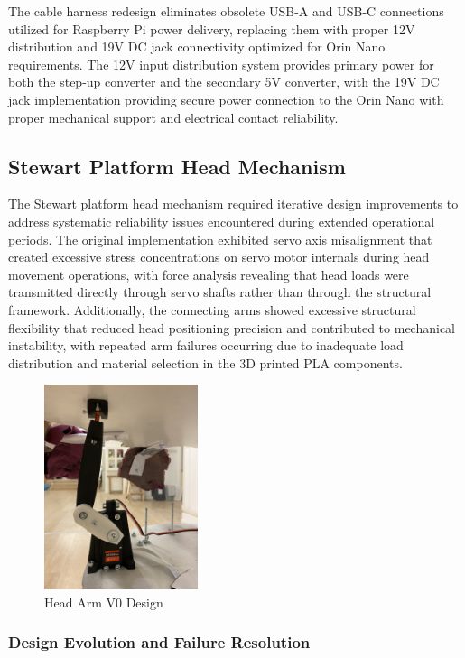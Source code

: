 The cable harness redesign eliminates obsolete USB-A and USB-C connections utilized for Raspberry Pi power delivery, replacing them with proper 12V distribution and 19V DC jack connectivity optimized for Orin Nano requirements. The 12V input distribution system provides primary power for both the step-up converter and the secondary 5V converter, with the 19V DC jack implementation providing secure power connection to the Orin Nano with proper mechanical support and electrical contact reliability.
\subsection{Stewart Platform Head Mechanism}

The Stewart platform head mechanism required iterative design improvements to address systematic reliability issues encountered during extended operational periods. The original implementation exhibited servo axis misalignment that created excessive stress concentrations on servo motor internals during head movement operations, with force analysis revealing that head loads were transmitted directly through servo shafts rather than through the structural framework. Additionally, the connecting arms showed excessive structural flexibility that reduced head positioning precision and contributed to mechanical instability, with repeated arm failures occurring due to inadequate load distribution and material selection in the 3D printed PLA components.

\begin{figure}[H]
    \centering
    \includegraphics[height=6cm]{Images/signle_head_motor.jpg}
    \caption{Head Arm V0 Design}
    \label{fig:head_arm_v0}
\end{figure}

\subsubsection{Design Evolution and Failure Resolution}

